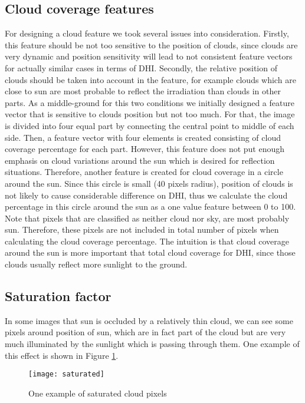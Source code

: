 \subsection{Cloud coverage features}
\label{sec:cc_around_sun}
For designing a cloud feature we took several issues into consideration. Firstly, this feature should be not too sensitive to the position of clouds, since clouds are very dynamic and position sensitivity will lead to not consistent feature vectors for actually similar cases in terms of DHI. Secondly, the relative position of clouds should be taken into account in the feature, for example clouds which are close to sun are most probable to reflect the irradiation than clouds in other parts. As a middle-ground for this two conditions we initially designed a feature vector that is sensitive to clouds position but not too much. For that, the image is divided into four equal part by connecting the central point to middle of each side. Then, a feature vector with four elements is created consisting of cloud coverage percentage for each part. However, this feature does not put enough emphasis on cloud variations around the sun which is desired for reflection situations. Therefore, another feature is created for cloud coverage in a circle around the sun. Since this circle is small (40 pixels radius), position of clouds is not likely to cause considerable difference on DHI, thus we calculate the cloud percentage in this circle around the sun as a one value feature between 0 to 100. Note that pixels that are classified as neither cloud nor sky, are most probably sun. Therefore, these pixels are not included in total number of pixels when calculating the cloud coverage percentage. The intuition is that cloud coverage around the sun is more important that total cloud coverage for DHI, since those clouds usually reflect more sunlight to the ground. 

\subsection{Saturation factor}
\label{sec:saturation}
In some images that sun is occluded by a relatively thin cloud, we can see some pixels around position of sun, which are in fact part of the cloud but are very much illuminated by the sunlight which is passing through them. One example of this effect is shown in Figure \ref{fig:saturated_example}. 

\begin{figure}[h]
\caption{One example of saturated cloud pixels}
\label{fig:saturated_example}
\texttt{[image: saturated]}
\centering
\end{figure}

